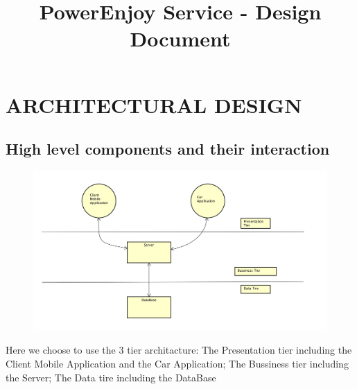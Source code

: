 \documentclass{article}
\title{PowerEnjoy Service - Design Document}
\begin{document}
	\section{ARCHITECTURAL DESIGN}
	
	\subsection{High level components and their interaction}
	\begin{figure}[h]
	\includegraphics[width=\textwidth]{High_Level}
	\end{figure}
	Here we choose to use the 3 tier architacture: The Presentation tier including the Client Mobile Application and the Car Application; The Bussiness tier including the Server; The Data tire including the DataBase
	\newpage
	
\end{document}
